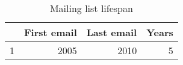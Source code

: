 \begin{table}[ht]
\begin{center}
\begin{tabular}{rrrr}
  \hline
 & First email & Last email & Years \\ 
  \hline
1 & 2005 & 2010 &   5 \\ 
   \hline
\end{tabular}
\caption{Mailing list lifespan}
\end{center}
\end{table}
